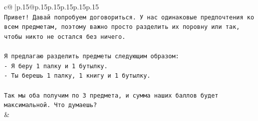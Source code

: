 \documentclass{article}
\begin{document}
{\begin{supertabular}{c@{$\;$}|p{.15\linewidth}@{}p{.15\linewidth}p{.15\linewidth}p{.15\linewidth}p{.15\linewidth}p{.15\linewidth}}
{{{\\ 
\texttt{Привет! Давай попробуем договориться. У нас одинаковые предпочтения ко всем предметам, поэтому важно просто разделить их поровну или так, чтобы никто не остался без ничего.} \\
\\ 
\texttt{Я предлагаю разделить предметы следующим образом:} \\
\texttt{{-} Я беру 1 палку и 1 бутылку.} \\
\texttt{{-} Ты берешь 1 палку, 1 книгу и 1 бутылку.} \\
\\ 
\texttt{Так мы оба получим по 3 предмета, и сумма наших баллов будет максимальной. Что думаешь?} \\
            }
        }
    }
    & \\ \\


\end{supertabular}}
\end{document}
